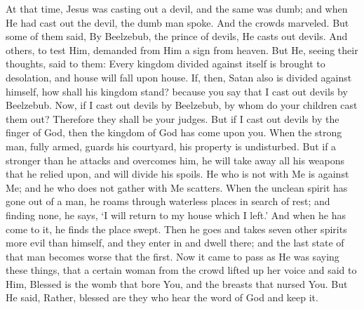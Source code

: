 {{At that time, Jesus was casting out a devil, and the same was dumb; and when He had cast out the devil, the dumb man spoke. And the crowds marveled. But some of them said, By Beelzebub, the prince of devils, He casts out devils. And others, to test Him, demanded from Him a sign from heaven. But He, seeing their thoughts, said to them: Every kingdom divided against itself is brought to desolation, and house will fall upon house. If, then, Satan also is divided against himself, how shall his kingdom stand? because you say that I cast out devils by Beelzebub. Now, if I cast out devils by Beelzebub, by whom do your children cast them out? Therefore they shall be your judges. But if I cast out devils by the finger of God, then the kingdom of God has come upon you. When the strong man, fully armed, guards his courtyard, his property is undisturbed. But if a stronger than he attacks and overcomes him, he will take away all his weapons that he relied upon, and will divide his spoils. He who is not with Me is against Me; and he who does not gather with Me scatters. When the unclean spirit has gone out of a man, he roams through waterless places in search of rest; and finding none, he says, ‘I will return to my house which I left.’ And when he has come to it, he finds the place swept. Then he goes and takes seven other spirits more evil than himself, and they enter in and dwell there; and the last state of that man becomes worse that the first. Now it came to pass as He was saying these things, that a certain woman from the crowd lifted up her voice and said to Him, Blessed is the womb that bore You, and the breasts that nursed You. But He said, Rather, blessed are they who hear the word of God and keep it.
  }
}
\newcommand{\offertory}{%
  Iustítiæ Dómini rectæ, lætificántes corda, et iudícia eius dulcióra super mel et favum: nam et servus tuus custódit ea.
}
\newcommand{\offertoryTranslation}{%
  The precepts of the Lord are right, rejoicing the heart, and His ordinances are sweeter than syrup or honey from the comb; therefore Your servant is careful of them.
}
\newcommand{\secret}{%
  \l{%
    Hæc hóstia, Dómine, quǽsumus, emúndet nostra delícta: et, ad sacrifícium celebrándum, subditórum tibi córpora mentésque sanctíficet.
  }
  \e{%
    May this offering, we beseech You, O Lord, cleanse us of our sins, and make holy the bodies and minds of Your servants for the celebration of the sacrificial rite.
  }
  \per
}
\newcommand{\communion}{%
  Passer invénit sibi domum, et turtur nidum, ubi repónat pullos suos: altária tua, Dómine virtútum, Rex meus, et Deus meus: beáti, qui hábitant in domo tua, in sǽculum sǽculi laudábunt te.
}
\newcommand{\communionTranslation}{%
  The sparrow finds a home, and the swallow a nest in which she puts her young - Your altars, O Lord of Hosts, my King and my God! Happy they who dwell in Your house! continually they praise You.
}
\newcommand{\postcommunion}{%
  \l{%
    A cunctis nos, quǽsumus, Dómine, reátibus et perículis propitiátus absólve: quos tanti mystérii tríbuis esse partícipes.
  }
  \e{%
    Be merciful, O Lord, we beseech You, and free from guilt and danger those whom You grant to share in this great sacrament.
  }
  \per
}

